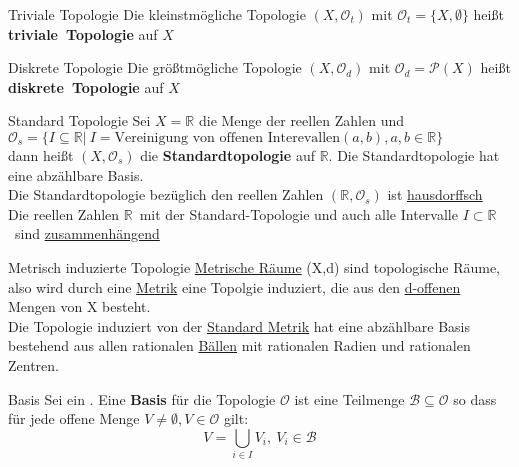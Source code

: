 \begin{titleDef}{Triviale Topologie}
\label{trivTopo}
Die kleinstmögliche Topologie $(X,\mathcal{O}_t)$ mit $\mathcal{O}_t=\{X,\emptyset\}$ heißt \mbox{\textbf{triviale Topologie}} auf $X$
\end{titleDef}

\begin{titleDef}{Diskrete Topologie}
\label{diskTopo}
Die größtmögliche Topologie $(X,\mathcal{O}_d)$ mit $\mathcal{O}_d=\mathcal{P}(X)$ heißt \mbox{\textbf{diskrete Topologie}} auf $X$
\end{titleDef}

\begin{titleDef}{Standard Topologie}
\label{stdTopo}
Sei $X=\mathbb{R}$ die Menge der reellen Zahlen und\\ ${\mathcal{O}_s=\{I\subseteq\mathbb{R}| \ I=\text{Vereinigung von offenen Interevallen} (a,b),a,b\in\mathbb{R}\}}$\\
dann heißt $(X,\mathcal{O}_s)$ die \mbox{\textbf{Standardtopologie}} auf $\mathbb{R}$.
Die Standardtopologie hat eine abzählbare Basis.\\
Die Standardtopologie bezüglich den reellen Zahlen $(\mathbb{R},\mathcal{O}_s)$ ist \hyperref[hausdorffsch]{hausdorffsch}\\
Die reellen Zahlen $\mathbb{R}$~mit der Standard-Topologie und auch alle Intervalle $I\subset\mathbb{R}$~sind \hyperref[zusammenhang]{zusammenhängend}
\end{titleDef}

\begin{titleDef}{Metrisch induzierte Topologie}
\label{metTopo}
\hyperref[MetrischerRaum]{Metrische Räume} (X,d) sind topologische Räume, also wird durch eine \hyperref[Metrik]{Metrik} eine Topolgie induziert, die aus den \hyperref[doffen]{d-offenen} Mengen von X besteht.
\\Die Topologie induziert von der \hyperref[stdmetrik]{Standard Metrik} hat eine abzählbare Basis bestehend aus allen rationalen \hyperref[balloffen]{Bällen} mit rationalen Radien und rationalen Zentren.
\end{titleDef}

\begin{titleDef}{Basis}
\label{basisTopo}
Sei \Topo ein \Toporef. Eine \textbf{Basis} für die Topologie $\mathcal{O}$ ist eine Teilmenge $\mathcal{B}\subseteq\mathcal{O}$ so dass für jede offene Menge $V\neq\emptyset, V\in\mathcal{O}$ gilt:
$$V=\bigcup_{i\in I}V_i, \ V_i\in\mathcal{B}$$
\end{titleDef}

